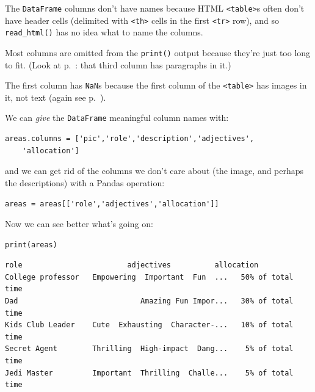 \begin{compactenum}

\item The \texttt{DataFrame} columns don't have names because HTML
\texttt{<table>}s often don't have header cells (delimited with \texttt{<th>}
cells in the first \texttt{<tr>} row), and so \texttt{read\_html()} has no idea
what to name the columns.

\item Most columns are omitted from the \texttt{print()} output because they're
just too long to fit. (Look at p.~\pageref{stephenpage}: that third column has paragraphs in it.)

\item The first column has \texttt{NaN}s because the first column of the
\texttt{<table>} has images in it, not text (again see
p.~\pageref{stephenpage}).

\end{compactenum}

We can \textit{give} the \texttt{DataFrame} meaningful column names with:

\begin{Verbatim}[fontsize=\small,samepage=true,frame=single,framesep=3mm]
areas.columns = ['pic','role','description','adjectives',
    'allocation']
\end{Verbatim}

and we can get rid of the columns we don't care about (the image, and perhaps
the descriptions) with a Pandas operation:

\begin{Verbatim}[fontsize=\small,samepage=true,frame=single,framesep=3mm]
areas = areas[['role','adjectives','allocation']]
\end{Verbatim}

Now we can see better what's going on:

\begin{Verbatim}[fontsize=\small,samepage=true,frame=single,framesep=3mm]
print(areas)
\end{Verbatim}

\vspace{-.2in}

\begin{Verbatim}[fontsize=\scriptsize,samepage=true,frame=leftline,framesep=3mm,framerule=1mm]
             role                        adjectives          allocation
College professor   Empowering  Important  Fun  ...   50% of total time
Dad                            Amazing Fun Impor...   30% of total time
Kids Club Leader    Cute  Exhausting  Character-...   10% of total time
Secret Agent        Thrilling  High-impact  Dang...    5% of total time
Jedi Master         Important  Thrilling  Challe...    5% of total time
\end{Verbatim}

